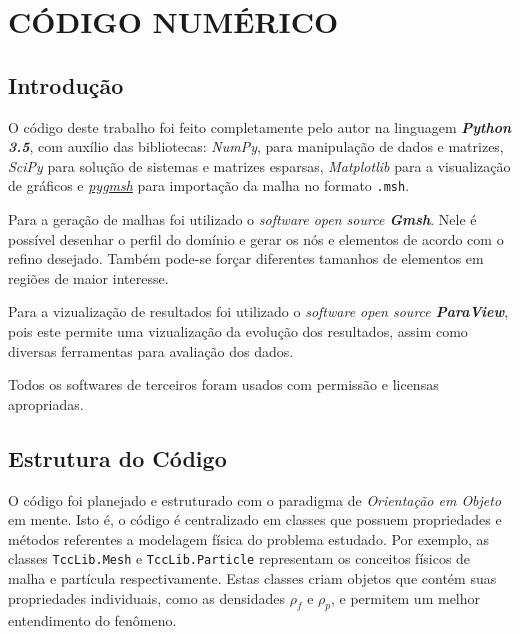 \chapter{\textbf{CÓDIGO NUMÉRICO}}
\label{sec_codigo}

\section{\textbf{Introdução}}
O código deste trabalho foi feito completamente pelo autor na linguagem \textbf{\textit{Python 3.5}}, com auxílio das bibliotecas: \textit{NumPy}, para manipulação de dados e matrizes, \textit{SciPy} para solução de sistemas e matrizes esparsas, \textit{Matplotlib} para a visualização de gráficos e \href{https://github.com/nschloe/pygmsh}{\textit{pygmsh}} para importação da malha no formato \verb|.msh|.

Para a geração de malhas foi utilizado o \textit{software open source \textbf{Gmsh}}.
Nele é possível desenhar o perfil do domínio e gerar os nós e elementos de acordo com o refino desejado.
Também pode-se forçar diferentes tamanhos de elementos em regiões de maior interesse.

Para a vizualização de resultados foi utilizado o \textit{software open source \textbf{ParaView}}, pois este permite uma vizualização da evolução dos resultados, assim como diversas ferramentas para avaliação dos dados.

Todos os softwares de terceiros foram usados com permissão e licensas apropriadas.

\section{\textbf{Estrutura do Código}}
O código foi planejado e estruturado com o paradigma de \textit{Orientação em Objeto} em mente.
Isto é, o código é centralizado em classes que possuem propriedades e métodos referentes a modelagem física do problema estudado.
Por exemplo, as classes \verb|TccLib.Mesh| e \verb|TccLib.Particle| representam os conceitos físicos de malha e partícula respectivamente.
Estas classes criam objetos que contém suas propriedades individuais, como as densidades $\rho_f$ e $\rho_p$, e permitem um melhor entendimento do fenômeno.

